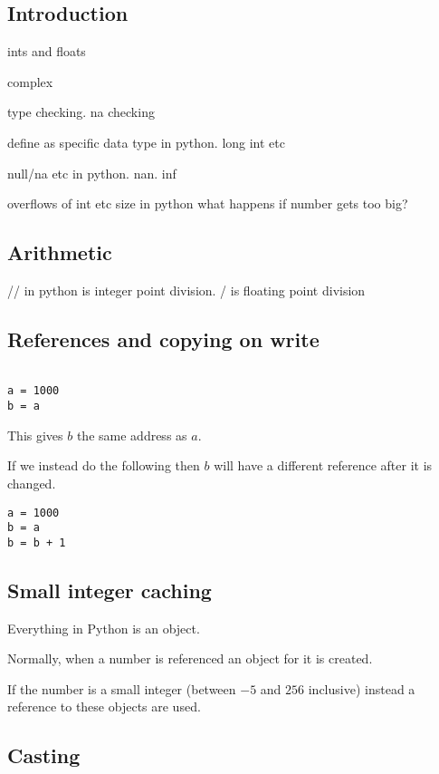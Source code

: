 
\subsection{Introduction}

ints and floats

complex


type checking. na checking

define as specific data type in python. long int etc

null/na etc in python. nan. inf

overflows of int etc size in python
what happens if number gets too big?


\subsection{Arithmetic}

// in python is integer point division. / is floating point division

\subsection{References and copying on write}

\begin{verbatim}

a = 1000
b = a

\end{verbatim}

This gives \(b\) the same address as \(a\).

If we instead do the following then \(b\) will have a different reference after it is changed.

\begin{verbatim}
a = 1000
b = a
b = b + 1
\end{verbatim}


\subsection{Small integer caching}

Everything in Python is an object.

Normally, when a number is referenced an object for it is created.

If the number is a small integer (between \(-5\) and \(256\) inclusive) instead a reference to these objects are used.

\subsection{Casting}

